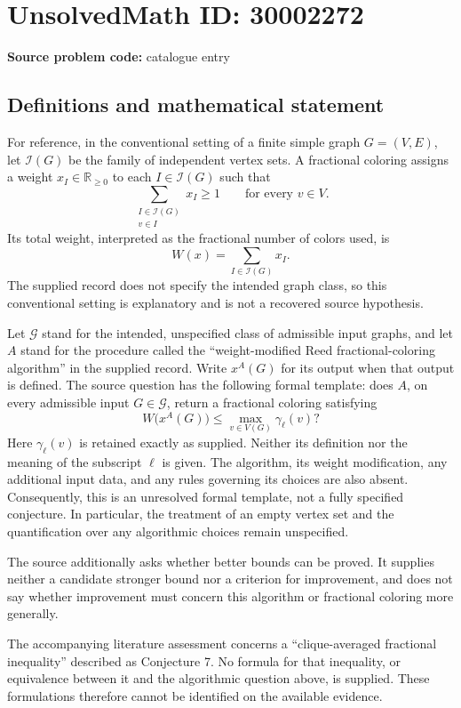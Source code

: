 \documentclass[11pt]{article}
\newcommand{\R}{\mathbb{R}}
\begin{document}
\section*{UnsolvedMath ID: 30002272}
\textbf{Source problem code:} catalogue entry
\subsection{Definitions and mathematical statement}
For reference, in the conventional setting of a finite simple graph \(G=(V,E)\), let \(\mathcal I(G)\) be the family of independent vertex sets. A fractional coloring assigns a weight \(x_I\in\R_{\geq 0}\) to each \(I\in\mathcal I(G)\) such that
\[
\sum_{\substack{I\in\mathcal I(G)\\v\in I}}x_I\geq 1
\qquad\text{for every }v\in V.
\]
Its total weight, interpreted as the fractional number of colors used, is
\[
W(x)=\sum_{I\in\mathcal I(G)}x_I.
\]
The supplied record does not specify the intended graph class, so this conventional setting is explanatory and is not a recovered source hypothesis.

Let \(\mathcal G\) stand for the intended, unspecified class of admissible input graphs, and let \(A\) stand for the procedure called the ``weight-modified Reed fractional-coloring algorithm'' in the supplied record. Write \(x^A(G)\) for its output when that output is defined. The source question has the following formal template: does \(A\), on every admissible input \(G\in\mathcal G\), return a fractional coloring satisfying
\[
W\bigl(x^A(G)\bigr)\leq
\max_{v\in V(G)}\gamma_\ell(v)?
\]
Here \(\gamma_\ell(v)\) is retained exactly as supplied. Neither its definition nor the meaning of the subscript \(\ell\) is given. The algorithm, its weight modification, any additional input data, and any rules governing its choices are also absent. Consequently, this is an unresolved formal template, not a fully specified conjecture. In particular, the treatment of an empty vertex set and the quantification over any algorithmic choices remain unspecified.

The source additionally asks whether better bounds can be proved. It supplies neither a candidate stronger bound nor a criterion for improvement, and does not say whether improvement must concern this algorithm or fractional coloring more generally.

The accompanying literature assessment concerns a ``clique-averaged fractional inequality'' described as Conjecture 7. No formula for that inequality, or equivalence between it and the algorithmic question above, is supplied. These formulations therefore cannot be identified on the available evidence.
\end{document}
